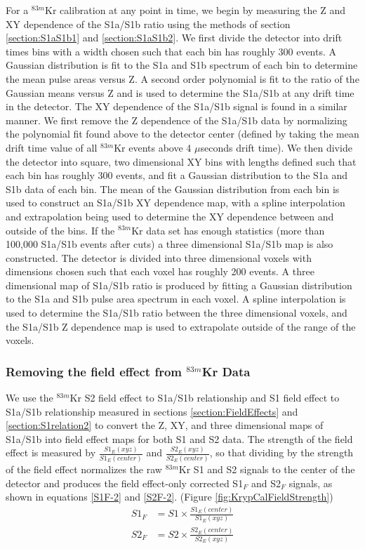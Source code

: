 \documentclass[a4paper,12pt]{article}
\begin{document}
{For a $^{83m}$Kr calibration at any point in time, we begin by measuring the Z and XY dependence of the S1a/S1b ratio using the methods of section  \ref{section:S1aS1b1} and  \ref{section:S1aS1b2}.  We first divide the detector into drift times bins with a width chosen such that each bin has roughly 300 events.   A Gaussian distribution is fit to the S1a and S1b spectrum of each bin to determine the mean pulse areas versus Z.  A second order polynomial is fit to the ratio of the Gaussian means versus Z and is used to determine the S1a/S1b at any drift time in the detector.  The XY dependence of the S1a/S1b signal is found in a similar manner.  We first remove the Z dependence of the S1a/S1b data by normalizing the polynomial fit found above to the detector center (defined by taking the mean drift time value of all $^{83m}$Kr events above 4 $\mu$seconds drift time). We then divide the detector into square, two dimensional XY bins with lengths defined such that each bin has roughly 300 events, and fit a Gaussian distribution to the S1a and S1b data of each bin.  The mean of the Gaussian distribution from each bin is used to construct an S1a/S1b XY dependence map, with a spline interpolation and extrapolation being used to determine the XY dependence between and outside of the bins.  If the $^{83m}$Kr data set has enough statistics (more than 100,000 S1a/S1b events after cuts) a three dimensional S1a/S1b map is also constructed. The detector is divided into three dimensional voxels with dimensions chosen such that each voxel has roughly 200 events.  A three dimensional map of S1a/S1b ratio is produced by fitting a Gaussian distribution to the S1a and S1b pulse area spectrum in each voxel.  A spline interpolation is used to determine the S1a/S1b ratio between the three dimensional voxels, and the S1a/S1b Z dependence map is used to extrapolate outside of the range of the voxels. 

\subsubsection{Removing the field effect from $^{83m}$Kr Data}

We use the $^{83m}$Kr S2 field effect to S1a/S1b relationship and S1 field effect to S1a/S1b relationship measured in sections \ref{section:FieldEffects} and \ref{section:S1relation2} to convert the Z, XY, and three dimensional maps of S1a/S1b into field effect maps for both S1 and S2 data.  The strength of the field effect is measured by $\frac{S1_E(xyz)}{S1_E(center)}$ and $\frac{S2_E(xyz)}{S2_E(center)}$, so that dividing by the strength of the field effect normalizes the raw $^{83m}$Kr S1 and S2 signals to the center of the detector and produces the field effect-only corrected S1$_F$ and S2$_F$ signals, as shown in equations \ref{S1F-2} and \ref{S2F-2}. (Figure \ref{fig:KrypCalFieldStrength})
\begin{align} 
S1_F &=S1 \times \frac{S1_E(center)}{S1_E(xyz)} \label{S1F-2} \\
S2_F &=S2 \times \frac{S2_E(center)}{S2_E(xyz)} \label{S2F-2}
\end{align}


}
\end{document}

